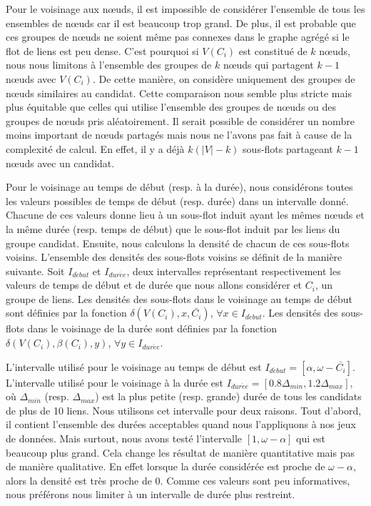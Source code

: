 Pour le voisinage aux n\oe{}uds, il est impossible de considérer l'ensemble de tous les ensembles de n\oe{}uds car il est beaucoup trop grand.
De plus, il est probable que ces groupes de n\oe{}uds ne soient même pas connexes dans le graphe agrégé si le flot de liens est peu dense.
C'est pourquoi si $V(C_i)$ est constitué de $k$ n\oe{}uds, nous nous limitons à l'ensemble des groupes de $k$ n\oe{}uds qui partagent $k-1$ n\oe{}uds avec $V(C_i)$.
De cette manière, on considère uniquement des groupes de n\oe{}uds similaires au candidat.
Cette comparaison nous semble plus stricte mais plus équitable que celles qui utilise l'ensemble des groupes de n\oe{}uds ou des groupes de n\oe{}uds pris aléatoirement.
Il serait possible de considérer un nombre moins important de n\oe{}uds partagés mais nous ne l'avons pas fait à cause de la complexité de calcul.
En effet, il y a déjà $k(|V|-k)$ sous-flots partageant $k-1$ n\oe{}uds avec un candidat.

Pour le voisinage au temps de début (resp. à la durée), nous considérons toutes les valeurs possibles de temps de début (resp. durée) dans un intervalle donné.
Chacune de ces valeurs donne lieu à un sous-flot induit ayant les mêmes n\oe{}uds et la même durée (resp. temps de début) que le sous-flot induit par les liens du groupe candidat.
Ensuite, nous calculons la densité de chacun de ces sous-flots voisins.
L'ensemble des densités des sous-flots voisins se définit de la manière suivante.
Soit $I_{d\acute{e}but}$ et $I_{dur\acute{e}e}$, deux intervalles représentant respectivement les valeurs de temps de début et de durée que nous allons considérer et $C_i$, un groupe de liens.
Les densités des sous-flots dans le voisinage au temps de début sont définies par la fonction $\delta(V(C_i),x, \bar{C_i})$, $\forall x \in I_{d\acute{e}but}$.
Les densités des sous-flots dans le voisinage de la durée sont définies par la fonction $\delta(V(C_i),\beta(C_i), y)$, $\forall y \in I_{dur\acute{e}e}$.

L'intervalle utilisé pour le voisinage au temps de début est $I_{d\acute{e}but}=[\alpha, \omega-\bar{C_i}]$.
L'intervalle utilisé pour le voisinage à la durée est $I_{dur\acute{e}e}=[0.8\Delta_{min}, 1.2\Delta_{max}]$, où $\Delta_{min}$ (resp. $\Delta_{max}$) est la plus petite (resp. grande) durée de tous les candidats de plus de 10 liens.
Nous utilisons cet intervalle pour deux raisons.
Tout d'abord, il contient l'ensemble des durées acceptables quand nous l'appliquons à nos jeux de données.
Mais surtout, nous avons testé l'intervalle $[1,\omega-\alpha]$ qui est beaucoup plus grand.
Cela change les résultat de manière quantitative mais pas de manière qualitative.
En effet lorsque la durée considérée est proche de $\omega-\alpha$, alors la densité est très proche de $0$.
Comme ces valeurs sont peu informatives, nous préférons nous limiter à un intervalle de durée plus restreint.
\bigskip

